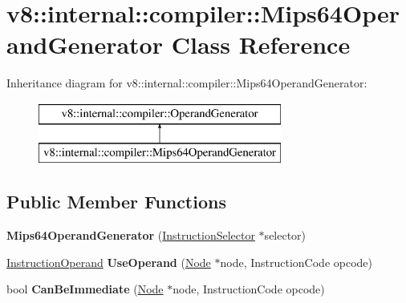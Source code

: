 \hypertarget{classv8_1_1internal_1_1compiler_1_1_mips64_operand_generator}{}\section{v8\+:\+:internal\+:\+:compiler\+:\+:Mips64\+Operand\+Generator Class Reference}
\label{classv8_1_1internal_1_1compiler_1_1_mips64_operand_generator}
Inheritance diagram for v8\+:\+:internal\+:\+:compiler\+:\+:Mips64\+Operand\+Generator\+:\begin{figure}[H]
\begin{center}
\leavevmode
\includegraphics[height=2.000000cm]{classv8_1_1internal_1_1compiler_1_1_mips64_operand_generator}
\end{center}
\end{figure}
\subsection*{Public Member Functions}
\begin{DoxyCompactItemize}
\item 
{\bfseries Mips64\+Operand\+Generator} (\hyperlink{classv8_1_1internal_1_1compiler_1_1_instruction_selector}{Instruction\+Selector} $\ast$selector)\hypertarget{classv8_1_1internal_1_1compiler_1_1_mips64_operand_generator_a45f61b896da7479b437460c10fb4c07c}{}\label{classv8_1_1internal_1_1compiler_1_1_mips64_operand_generator_a45f61b896da7479b437460c10fb4c07c}

\item 
\hyperlink{classv8_1_1internal_1_1compiler_1_1_instruction_operand}{Instruction\+Operand} {\bfseries Use\+Operand} (\hyperlink{classv8_1_1internal_1_1compiler_1_1_node}{Node} $\ast$node, Instruction\+Code opcode)\hypertarget{classv8_1_1internal_1_1compiler_1_1_mips64_operand_generator_aacc38ec413f0822cb23f574c0ba8ad0a}{}\label{classv8_1_1internal_1_1compiler_1_1_mips64_operand_generator_aacc38ec413f0822cb23f574c0ba8ad0a}

\item 
bool {\bfseries Can\+Be\+Immediate} (\hyperlink{classv8_1_1internal_1_1compiler_1_1_node}{Node} $\ast$node, Instruction\+Code opcode)\hypertarget{classv8_1_1internal_1_1compiler_1_1_mips64_operand_generator_abcbbb8bd6b7c2fb88302b646b3ab4765}{}\label{classv8_1_1internal_1_1compiler_1_1_mips64_operand_generator_abcbbb8bd6b7c2fb88302b646b3ab4765}

\end{DoxyCompactItemize}
